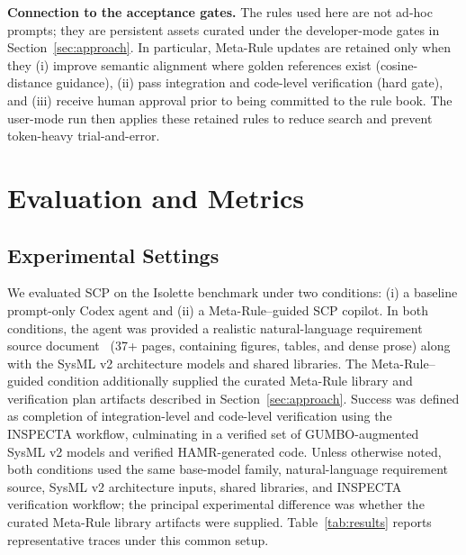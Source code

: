 \documentclass[conference]{IEEEtran}
\begin{document}
\textbf{Connection to the acceptance gates.} The rules used here are not ad-hoc prompts; they are persistent assets curated under the developer-mode gates in Section~\ref{sec:approach}. In particular, Meta-Rule updates are retained only when they (i) improve semantic alignment where golden references exist (cosine-distance guidance), (ii) pass integration and code-level verification (hard gate), and (iii) receive human approval prior to being committed to the rule book. The user-mode run then applies these retained rules to reduce search and prevent token-heavy trial-and-error.


\section{Evaluation and Metrics}
\label{sec:evaluation}

\subsection{Experimental Settings}
We evaluated SCP on the Isolette benchmark under two conditions: (i) a baseline prompt-only Codex agent and (ii) a Meta-Rule--guided SCP copilot. In both conditions, the agent was provided a realistic natural-language requirement source document~\cite{SteveMillerGuideBook} (37+ pages, containing figures, tables, and dense prose) along with the SysML v2 architecture models and shared libraries. The Meta-Rule--guided condition additionally supplied the curated Meta-Rule library and verification plan artifacts described in Section~\ref{sec:approach}. Success was defined as completion of integration-level and code-level verification using the INSPECTA workflow, culminating in a verified set of GUMBO-augmented SysML v2 models and verified HAMR-generated code. Unless otherwise noted, both conditions used the same base-model family, natural-language requirement source, SysML v2 architecture inputs, shared libraries, and INSPECTA verification workflow; the principal experimental difference was whether the curated Meta-Rule library artifacts were supplied. Table~\ref{tab:results} reports representative traces under this common setup.
\end{document}
